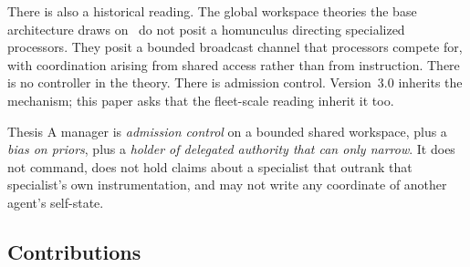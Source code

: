 \documentclass[11pt]{article}
\begin{document}
There is also a historical reading. The global workspace theories the base architecture draws on~\citep{dehaene1998workspace,dehaene2011conscious} do not posit a homunculus directing specialized processors. They posit a bounded broadcast channel that processors compete for, with coordination arising from shared access rather than from instruction. There is no controller in the theory. There is admission control. Version~3.0 inherits the mechanism; this paper asks that the fleet-scale reading inherit it too.

\begin{claimbox}{Thesis}
A manager is \emph{admission control} on a bounded shared workspace, plus a \emph{bias on priors}, plus a \emph{holder of delegated authority that can only narrow}. It does not command, does not hold claims about a specialist that outrank that specialist's own instrumentation, and may not write any coordinate of another agent's self-state.
\end{claimbox}

\subsection{Contributions}
\end{document}

